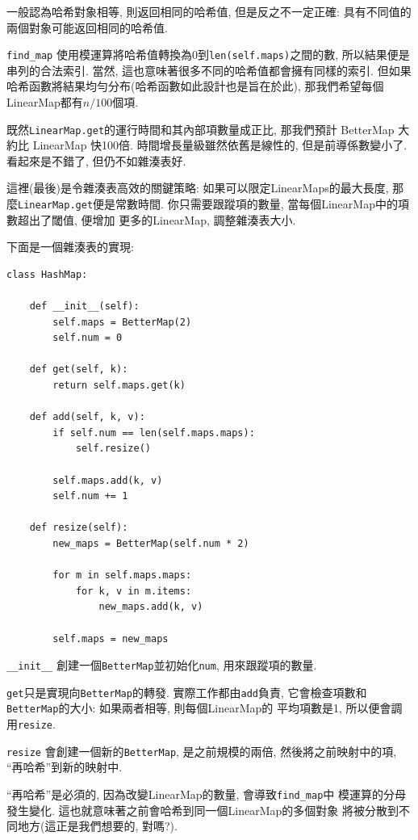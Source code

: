 \documentclass[10pt]{book}
\begin{document}
一般認為哈希對象相等, 則返回相同的哈希值,
但是反之不一定正確: 具有不同值的兩個對象可能返回相同的哈希值.

\verb"find_map" 使用模運算將哈希值轉換為0到{\tt len(self.maps)}之間的數, 
所以結果便是串列的合法索引.
當然, 這也意味著很多不同的哈希值都會擁有同樣的索引. 
但如果哈希函數將結果均勻分布(哈希函數如此設計也是旨在於此), 
那我們希望每個LinearMap都有$n/100$個項. 

既然{\tt LinearMap.get}的運行時間和其內部項數量成正比, 
那我們預計 BetterMap 大約比 LinearMap 快100倍. 
時間增長量級雖然依舊是線性的, 但是前導係數變小了. 
看起來是不錯了, 但仍不如雜湊表好. 

這裡(最後)是令雜湊表高效的關鍵策略:
如果可以限定LinearMaps的最大長度, 那麼{\tt LinearMap.get}便是常數時間.
你只需要跟蹤項的數量, 當每個LinearMap中的項數超出了閾值, 便增加
更多的LinearMap, 調整雜湊表大小. 

下面是一個雜湊表的實現:

\begin{verbatim}
class HashMap:

    def __init__(self):
        self.maps = BetterMap(2)
        self.num = 0

    def get(self, k):
        return self.maps.get(k)

    def add(self, k, v):
        if self.num == len(self.maps.maps):
            self.resize()

        self.maps.add(k, v)
        self.num += 1

    def resize(self):
        new_maps = BetterMap(self.num * 2)

        for m in self.maps.maps:
            for k, v in m.items:
                new_maps.add(k, v)

        self.maps = new_maps
\end{verbatim}

\verb"__init__" 創建一個{\tt BetterMap}並初始化{\tt num}, 用來跟蹤項的數量. 

{\tt get}只是實現向{\tt BetterMap}的轉發. 實際工作都由{\tt add}負責,
它會檢查項數和{\tt BetterMap}的大小: 如果兩者相等, 則每個LinearMap的
平均項數是1, 所以便會調用{\tt resize}.


{\tt resize} 會創建一個新的{\tt BetterMap}, 是之前規模的兩倍, 
然後將之前映射中的項, ``再哈希''到新的映射中.

``再哈希''是必須的, 因為改變LinearMap的數量, 會導致\verb"find_map"中
模運算的分母發生變化. 這也就意味著之前會哈希到同一個LinearMap的多個對象
將被分散到不同地方(這正是我們想要的, 對嗎?).
\end{document}
